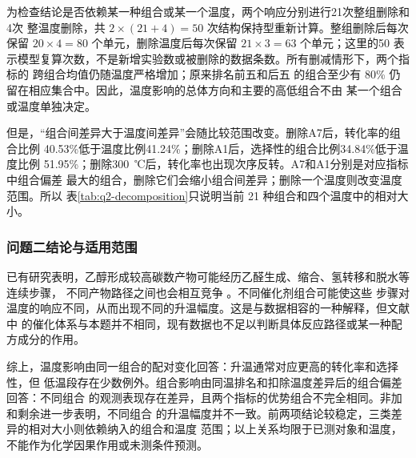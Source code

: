 为检查结论是否依赖某一种组合或某一个温度，两个响应分别进行21次整组删除和4次
整温度删除，共 \(2\times(21+4)=50\) 次结构保持型重新计算。整组删除后每次保留
\(20\times4=80\) 个单元，删除温度后每次保留 \(21\times3=63\) 个单元；这里的50
表示模型复算次数，不是新增实验数或被删除的数据条数。所有删减情形下，两个指标的
跨组合均值仍随温度严格增加；原来排名前五和后五
的组合至少有 80\% 仍留在相应集合中。因此，温度影响的总体方向和主要的高低组合不由
某一个组合或温度单独决定。

但是，``组合间差异大于温度间差异''会随比较范围改变。删除A7后，转化率的组合比例
40.53\%低于温度比例41.24\%；删除A1后，选择性的组合比例34.84\%低于温度比例
51.95\%；删除300~℃后，转化率也出现次序反转。A7和A1分别是对应指标中组合偏差
最大的组合，删除它们会缩小组合间差异；删除一个温度则改变温度范围。所以
表\ref{tab:q2-decomposition}只说明当前 21 种组合和四个温度中的相对大小。

\subsubsection{问题二结论与适用范围}

已有研究表明，乙醇形成较高碳数产物可能经历乙醛生成、缩合、氢转移和脱水等连续步骤，
不同产物路径之间也会相互竞争 \cite{ho2016,moteki2016}。不同催化剂组合可能使这些
步骤对温度的响应不同，从而出现不同的升温幅度。这是与数据相容的一种解释，但文献中
的催化体系与本题并不相同，现有数据也不足以判断具体反应路径或某一种配方成分的作用。

综上，温度影响由同一组合的配对变化回答：升温通常对应更高的转化率和选择性，但
低温段存在少数例外。组合影响由同温排名和扣除温度差异后的组合偏差回答：不同组合
的观测表现存在差异，且两个指标的优势组合不完全相同。非加和剩余进一步表明，不同组合
的升温幅度并不一致。前两项结论较稳定，三类差异的相对大小则依赖纳入的组合和温度
范围；以上关系均限于已测对象和温度，不能作为化学因果作用或未测条件预测。
